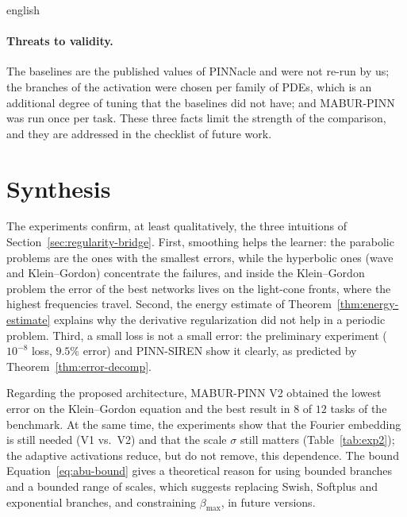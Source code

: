 \documentclass[../0000.tex]{subfiles}
\begin{document}
\begin{hyphenrules}{english}
\paragraph{Threats to validity.}
The baselines are the published values of PINNacle and were not re-run by us; the branches of the
activation were chosen per family of PDEs, which is an additional degree of tuning that the baselines did
not have; and MABUR-PINN was run once per task. These three facts limit the strength of the comparison,
and they are addressed in the checklist of future work.

\section{Synthesis}\label{sec:exp-synthesis}

The experiments confirm, at least qualitatively, the three intuitions of Section~\ref{sec:regularity-bridge}.
First, smoothing helps the learner: the parabolic problems are the ones with the smallest errors, while the
hyperbolic ones (wave and Klein--Gordon) concentrate the failures, and inside the Klein--Gordon problem the
error of the best networks lives on the light-cone fronts, where the highest frequencies travel. Second, the
energy estimate of Theorem~\ref{thm:energy-estimate} explains why the derivative regularization did not help in a
periodic problem. Third, a small loss is not a small error: the preliminary experiment ($10^{-8}$ loss,
$9.5\%$ error) and PINN-SIREN show it clearly, as predicted by Theorem~\ref{thm:error-decomp}.

Regarding the proposed architecture, MABUR-PINN V2 obtained the lowest error on the Klein--Gordon equation and
the best result in $8$ of $12$ tasks of the benchmark. At the same time, the experiments show that the
Fourier embedding is still needed (V1 vs.\ V2) and that the scale $\sigma$ still matters
(Table~\ref{tab:exp2}); the adaptive activations reduce, but do not remove, this dependence. The bound
Equation~\eqref{eq:abu-bound} gives a theoretical reason for using bounded branches and a bounded range of scales,
which suggests replacing Swish, Softplus and exponential branches, and constraining $\beta_{\max}$, in
future versions.

\end{hyphenrules}

\ifSubfilesClassLoaded{}{}
\end{document}
